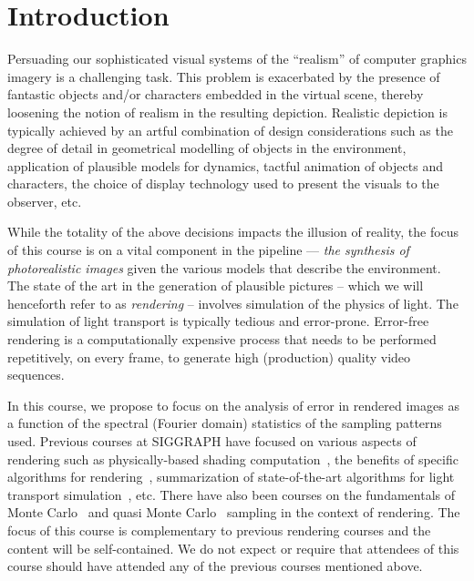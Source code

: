 \documentclass[11pt,fleqn]{book} %
\begin{document}

\chapter{Introduction}
Persuading our sophisticated visual systems of the ``realism'' of computer graphics imagery is a challenging task. 
This problem is exacerbated by the presence of fantastic objects and/or characters embedded in the virtual scene, thereby loosening the notion of realism in the resulting depiction. 
Realistic depiction is typically achieved by an artful combination of design considerations such as the degree of detail in geometrical modelling of objects in the environment, application of plausible models for dynamics, tactful animation of objects and characters, the choice of display technology used to present the visuals to the observer, etc. 

While the totality of the above decisions impacts the illusion of reality, the focus of this course is on a vital component in the pipeline --- \textit{the synthesis of photorealistic images} given the various models that describe the environment. The state of the art in the generation of plausible pictures -- which we will henceforth refer to as \textit{rendering} --  involves simulation of the physics of light. 
The simulation of light transport is typically tedious and error-prone.
Error-free rendering is a computationally expensive process that needs to be performed repetitively, on every frame, to generate high (production) quality video sequences. 

In this course, we propose to focus on the analysis of error in rendered images as a function of the spectral (Fourier domain) statistics of the sampling patterns used.  Previous courses at SIGGRAPH have focused on various aspects of rendering such as physically-based shading computation~\cite{NatyCourse}, the benefits of specific algorithms for rendering~\cite{pathtracingrevolution,photonmapping}, summarization of state-of-the-art algorithms for light transport simulation~\cite{JaroRecentAdvances}, etc. There have also been courses on the fundamentals of Monte Carlo~\cite{MCRayTracing} and quasi Monte Carlo~\cite{AdvancedQuasiMC} sampling in the context of rendering. The focus of this course is complementary to previous rendering courses and the content will be self-contained. We do not expect or require that attendees of this course should have attended any of the previous courses mentioned above.
\end{document}
